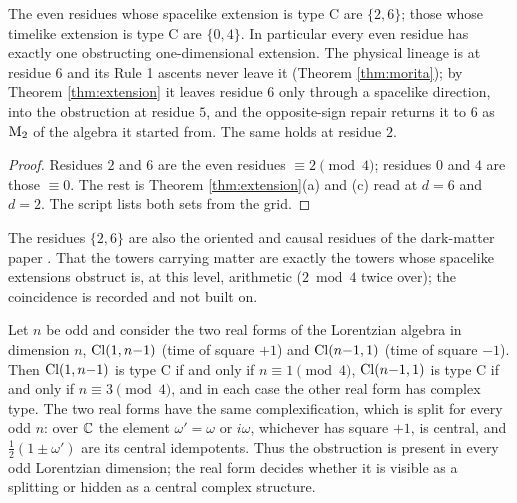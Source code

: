\begin{corollary}\label{cor:residues}
The even residues whose spacelike extension is type C are $\{2, 6\}$; those whose timelike extension is type C are $\{0, 4\}$. In particular every even residue has exactly one obstructing one-dimensional extension. The physical lineage is at residue $6$ and its Rule 1 ascents never leave it (Theorem \ref{thm:morita}); by Theorem \ref{thm:extension} it leaves residue $6$ only through a spacelike direction, into the obstruction at residue $5$, and the opposite-sign repair returns it to $6$ as $\mathrm{M}_2$ of the algebra it started from. The same holds at residue $2$.
\end{corollary}

\begin{proof}
Residues $2$ and $6$ are the even residues $\equiv 2 \pmod 4$; residues $0$ and $4$ are those $\equiv 0$. The rest is Theorem \ref{thm:extension}(a) and (c) read at $d = 6$ and $d = 2$. The script lists both sets from the grid.
\end{proof}

The residues $\{2, 6\}$ are also the oriented and causal residues of the dark-matter paper \cite[Cor.~3.11]{ButlerT14}. That the towers carrying matter are exactly the towers whose spacelike extensions obstruct is, at this level, arithmetic ($2 \bmod 4$ twice over); the coincidence is recorded and not built on.

\begin{corollary}\label{cor:lorentz}
Let $n$ be odd and consider the two real forms of the Lorentzian algebra in dimension $n$, $\mathrm{Cl}(1,n{-}1)$ (time of square $+1$) and $\mathrm{Cl}(n{-}1,1)$ (time of square $-1$). Then $\mathrm{Cl}(1,n{-}1)$ is type C if and only if $n \equiv 1 \pmod 4$, $\mathrm{Cl}(n{-}1,1)$ is type C if and only if $n \equiv 3 \pmod 4$, and in each case the other real form has complex type. The two real forms have the same complexification, which is split for every odd $n$: over $\mathbb{C}$ the element $\omega' = \omega$ or $i\omega$, whichever has square $+1$, is central, and $\tfrac12(1 \pm \omega')$ are its central idempotents. Thus the obstruction is present in every odd Lorentzian dimension; the real form decides whether it is visible as a splitting or hidden as a central complex structure.
\end{corollary}

